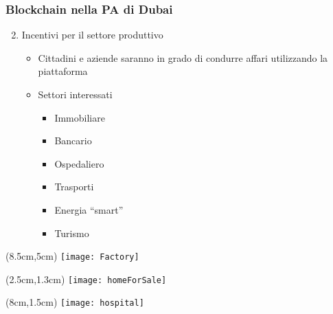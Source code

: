 \begin{frame}
 \frametitle{Blockchain nella PA di Dubai}

 \begin{enumerate}
 \setcounter{enumi}{1}
  \item<1-> Incentivi per il settore produttivo
  \begin{itemize}
   \item<2-> Cittadini e aziende saranno in grado di condurre affari
utilizzando la piattaforma
   \item<3-> Settori interessati
   \begin{itemize}
    \item Immobiliare
    \item Bancario
    \item Ospedaliero
    \item Trasporti
    \item Energia ``smart''
    \item Turismo

   \end{itemize}

  \end{itemize}

 \end{enumerate}
 
 
 \begin{textblock*}{5cm}(8.5cm,5cm)
  \texttt{[image: Factory]}
 \end{textblock*}
 
  
 \begin{textblock*}{5cm}(2.5cm,1.3cm)
  \texttt{[image: homeForSale]}
 \end{textblock*}
 
 \begin{textblock*}{5cm}(8cm,1.5cm)
  \texttt{[image: hospital]}
 \end{textblock*}

\end{frame}

